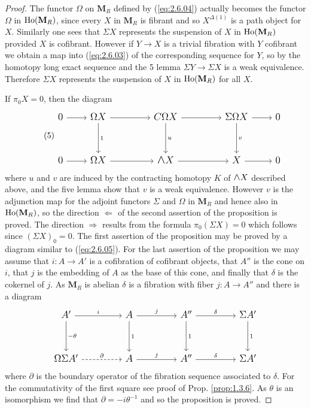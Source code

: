 \documentclass[../main]{subfiles}
\begin{document}
\begin{proof}
The functor $\Omega$ on $\mathbf{M}_R$ defined by (\ref{eq:2.6.04}) actually becomes the functor $\Omega$ in $\operatorname{Ho}(\mathbf{M}_R)$, since every $X$ in $\mathbf{M}_R$ is fibrant and so $X^{\Delta(1)}$ is a path object for $X$. Similarly one sees that $\Sigma X$ represents the suspension of $X$ in $\operatorname{Ho}(\mathbf{M}_R)$ provided $X$ is cofibrant. However if $Y\longrightarrow X$ is a trivial fibration with $Y$ cofibrant we obtain a map into (\ref{eq:2.6.03}) of the corresponding sequence for $Y$, so by the homotopy long exact sequence and the 5 lemma $\Sigma Y\longrightarrow\Sigma X$ is a weak equivalence. Therefore $\Sigma X$ represents the suspension of $X$ in $\operatorname{Ho}(\mathbf{M}_R)$ for all $X$.

If $\pi_0 X=0$, then the diagram
\begin{equation}\tag{5}
\label{eq:2.6.05}
\begin{tikzcd}[font=\large]
0\arrow{r}{}&\Omega X\arrow{rr}{}\arrow{dd}{1}&&C\Omega X\arrow{rr}{}\arrow{dd}{u}&&\Sigma\Omega X\arrow{r}{}\arrow{dd}{v}&0\\\\
0\arrow{r}{}&\Omega X\arrow{rr}&&\mathlarger{\mathlarger{\wedge}}X\arrow{rr}&& X\arrow{r}&0
\end{tikzcd}
\end{equation}
where $u$ and $v$ are induced by the contracting homotopy $K$ of $\mathlarger{\mathlarger{\wedge}}X$ described above, and the five lemma show that $v$ is a weak equivalence. However $v$ is the adjunction map for the adjoint functors $\Sigma$ and $\Omega$ in $\mathbf{M}_R$ and hence also in $\operatorname{Ho}(\mathbf{M}_R)$, so the direction $\Longleftarrow$ of the second assertion of the proposition is proved. The direction $\Longrightarrow$ results from the formula $\pi_0 (\Sigma X)=0$ which follows since $(\Sigma X)_{0}=0$. The first assertion of the proposition may be proved by a diagram similar to (\ref{eq:2.6.05}). For the last assertion of the proposition we may assume that $i:A\longrightarrow A'$ is a cofibration of cofibrant objects, that $A''$ is the cone on $i$, that $j$ is the embedding of $A$ as the base of this cone, and finally that $\delta$ is the cokernel of $j$. As $\mathbf{M}_R$ is abelian $\delta$ is a fibration with fiber $j:A\longrightarrow A''$ and there is a diagram 
\begin{equation*}
\begin{tikzcd}[font=\large]
A'\arrow{rr}{i}\arrow{dd}{-\theta}&&A\arrow{rr}{j}\arrow{dd}{1}&&A''\arrow{rr}{\delta}\arrow{dd}{1}&&\Sigma A'\arrow{dd}{1}\\\\
\Omega\Sigma A'\arrow[dashed]{rr}{\partial}&&A\arrow{rr}{j}&&A''\arrow{rr}{\delta}&&\Sigma A'
\end{tikzcd}
\end{equation*}
where $\partial$ is the boundary operator of the fibration sequence associated to $\delta$. For the commutativity of the first square see proof of Prop. \ref{prop:1.3.6}. As $\theta$ is an isomorphism we find that $\partial=-i\theta^{-1}$ and so the proposition is proved.
\end{proof}
\end{document}
